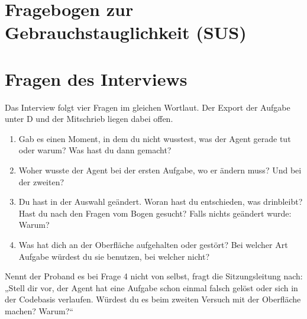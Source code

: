 \section{Fragebogen zur Gebrauchstauglichkeit (SUS)}
\label{app:sus}



\section{Fragen des Interviews}
\label{app:interview}

Das Interview folgt vier Fragen im gleichen Wortlaut. Der Export der Aufgabe unter D und der Mitschrieb liegen dabei offen.

\begin{enumerate}
\item Gab es einen Moment, in dem du nicht wusstest, was der Agent gerade tut oder warum? Was hast du dann gemacht?
\item Woher wusste der Agent bei der ersten Aufgabe, wo er ändern muss? Und bei der zweiten?
\item Du hast in der Auswahl geändert. Woran hast du entschieden, was drinbleibt? Hast du nach den Fragen vom Bogen gesucht? Falls nichts geändert wurde: Warum?
\item Was hat dich an der Oberfläche aufgehalten oder gestört? Bei welcher Art Aufgabe würdest du sie benutzen, bei welcher nicht?
\end{enumerate}

Nennt der Proband es bei Frage 4 nicht von selbst, fragt die Sitzungsleitung nach: „Stell dir vor, der Agent hat eine Aufgabe schon einmal falsch gelöst oder sich in der Codebasis verlaufen. Würdest du es beim zweiten Versuch mit der Oberfläche machen? Warum?“

